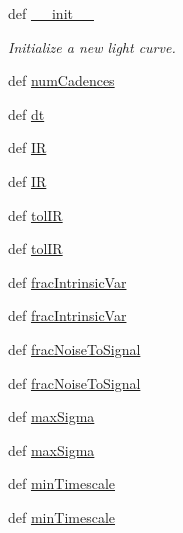 \begin{DoxyCompactItemize}
\item 
def \hyperlink{classpython_1_1libcarma_1_1libcarma_1_1lc_af851b738932e6bdd639294e11c71b566}{\-\_\-\-\_\-init\-\_\-\-\_\-}
\begin{DoxyCompactList}\small\item\em Initialize a new light curve. \end{DoxyCompactList}\item 
def \hyperlink{classpython_1_1libcarma_1_1libcarma_1_1lc_a16a861d93d995573e983e3f47238d088}{num\-Cadences}
\item 
def \hyperlink{classpython_1_1libcarma_1_1libcarma_1_1lc_a6c3bde750b398c74442d76d89844378c}{dt}
\item 
def \hyperlink{classpython_1_1libcarma_1_1libcarma_1_1lc_a57967beffce0d6d06b78c3049583851a}{I\-R}
\item 
def \hyperlink{classpython_1_1libcarma_1_1libcarma_1_1lc_a57967beffce0d6d06b78c3049583851a}{I\-R}
\item 
def \hyperlink{classpython_1_1libcarma_1_1libcarma_1_1lc_a98510c5215b5a090a756a5c57ad152a0}{tol\-I\-R}
\item 
def \hyperlink{classpython_1_1libcarma_1_1libcarma_1_1lc_a98510c5215b5a090a756a5c57ad152a0}{tol\-I\-R}
\item 
def \hyperlink{classpython_1_1libcarma_1_1libcarma_1_1lc_a4ef44c1d7314761337e2f28eb196fc49}{frac\-Intrinsic\-Var}
\item 
def \hyperlink{classpython_1_1libcarma_1_1libcarma_1_1lc_a4ef44c1d7314761337e2f28eb196fc49}{frac\-Intrinsic\-Var}
\item 
def \hyperlink{classpython_1_1libcarma_1_1libcarma_1_1lc_ad5fa38ac9d1875406ab8cfb48802c088}{frac\-Noise\-To\-Signal}
\item 
def \hyperlink{classpython_1_1libcarma_1_1libcarma_1_1lc_ad5fa38ac9d1875406ab8cfb48802c088}{frac\-Noise\-To\-Signal}
\item 
def \hyperlink{classpython_1_1libcarma_1_1libcarma_1_1lc_a5991eadc0ef728e10855017999d3604b}{max\-Sigma}
\item 
def \hyperlink{classpython_1_1libcarma_1_1libcarma_1_1lc_a5991eadc0ef728e10855017999d3604b}{max\-Sigma}
\item 
def \hyperlink{classpython_1_1libcarma_1_1libcarma_1_1lc_ac83a10daef56337045424a27f381fe47}{min\-Timescale}
\item 
def \hyperlink{classpython_1_1libcarma_1_1libcarma_1_1lc_ac83a10daef56337045424a27f381fe47}{min\-Timescale}
\item 

\end{DoxyCompactItemize}
